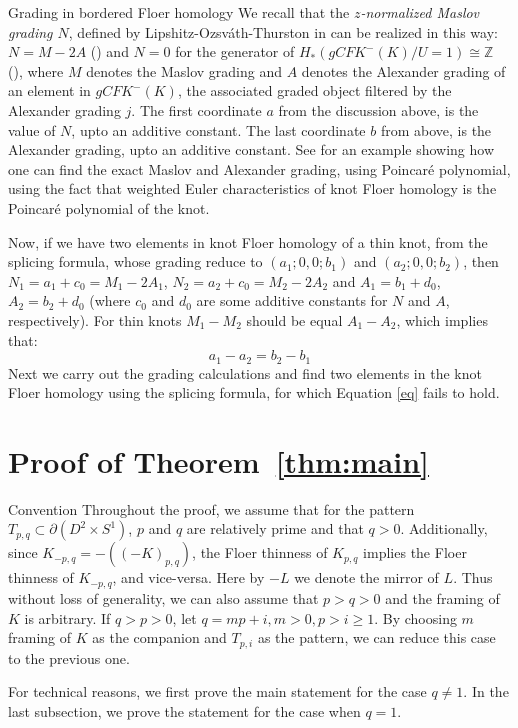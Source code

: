 \documentclass[11pt,reqno]{amsart}
\theoremstyle{definition}
\newtheorem *{remark}{Remark}
\begin{document}
\begin{subsection}{Grading in bordered Floer homology}
We recall that the \emph{$z$-normalized Maslov grading $N$}, defined by Lipshitz-Ozsv\'ath-Thurston in \cite[Section 11.3]{lot08} can be realized in this way: $N = M- 2A$ (\cite[Equation 11.13]{lot08}) and $N=0$ for the generator of $H_{*}(gCFK^{-}(K)/ U=1) \cong \mathbb{Z}$ (\cite[Equation 11.15]{lot08}), where $M$ denotes the Maslov grading and $A$ denotes the Alexander grading of an element in $gCFK^{-}(K)$, the associated graded object filtered by the Alexander grading $j$. The first coordinate $a$ from the discussion above, is the value of $N$, upto an additive constant. The last coordinate $b$ from above, is the Alexander grading, upto an additive constant. See \cite[11.9]{lot08} for an example showing how one can find the exact Maslov and Alexander grading, using Poincar\'e polynomial, using the fact that weighted Euler characteristics of knot Floer homology is the Poincar\'e polynomial of the knot.

Now, if we have two elements in knot Floer homology of a thin knot, from the splicing formula, whose grading reduce to $(a_1;0,0;b_1)$ and $(a_2;0,0;b_2)$, then $N_1 = a_1 + c_0 = M_1 - 2A_1$, $N_2 = a_2 + c_0 = M_2 - 2A_2$ and $A_1 = b_1 + d_0$, $A_2 = b_2 + d_0$ (where $c_0$ and $d_0$ are some additive constants for $N$ and $A$, respectively).  For thin knots $M_1 - M_2$ should be equal $A_1 - A_2$, which implies that:
\begin{equation}
\label{eq}
    a_1 - a_2 = b_2 - b_1
\end{equation}
 Next we carry out the grading calculations and find two elements in the knot Floer homology using the splicing formula, for which Equation \ref{eq} fails to hold.
     
 \end{subsection}
\section{Proof of Theorem~\ref{thm:main}}
\begin{subsection}{Convention}
Throughout the proof, we assume that for the pattern $T_{p,q} \subset \partial(D^2 \times S^1)$, $p$ and $q$ are relatively prime and that $q >0$.
Additionally, since $K_{-p,q} = -((-K)_{p,q})$, the Floer thinness of $K_{p,q}$ implies the Floer thinness of $K_{-p,q}$, and vice-versa. Here by $-L$ we denote the mirror of $L$. Thus without loss of generality, we can also assume that $p > q > 0 $ and the framing of $K$ is arbitrary.  If $q > p > 0$, let $q = mp+i, m > 0, p > i \geq 1$. By choosing $m$ framing of $K$ as the companion and $T_{p,i}$ as the pattern, we can reduce this case to the previous one.

For technical reasons, we first prove the main statement for the case $q \neq 1$. In the last subsection, we prove the statement for the case when $q=1$.
\end{subsection}
\end{document}
